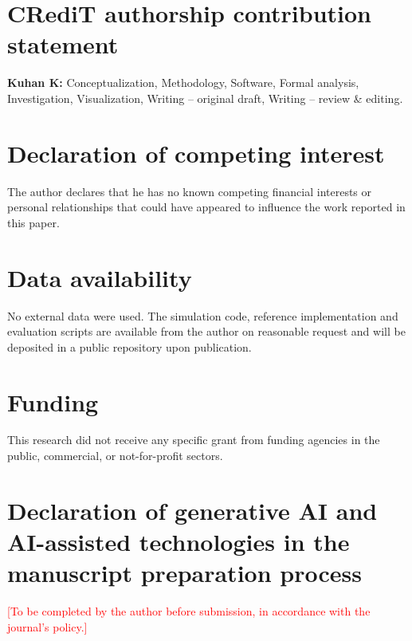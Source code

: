 \documentclass[preprint,12pt]{elsarticle}
\begin{document}
\section*{CRediT authorship contribution statement}
\textbf{Kuhan K:} Conceptualization, Methodology, Software, Formal analysis, Investigation, Visualization, Writing -- original draft, Writing -- review \& editing.

\section*{Declaration of competing interest}
The author declares that he has no known competing financial interests or personal relationships that could have appeared to influence the work reported in this paper.

\section*{Data availability}
No external data were used. The simulation code, reference implementation and evaluation scripts are available from the author on reasonable request and will be deposited in a public repository upon publication.

\section*{Funding}
This research did not receive any specific grant from funding agencies in the public, commercial, or not-for-profit sectors.

\section*{Declaration of generative AI and AI-assisted technologies in the manuscript preparation process}
\textcolor{red}{[To be completed by the author before submission, in accordance with the journal's policy.]}



\end{document}
